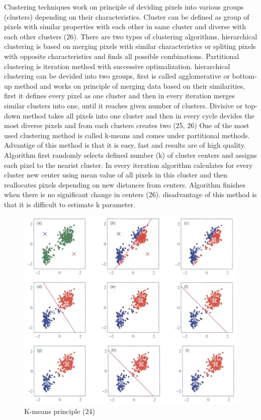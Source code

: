 \documentclass[a4paper,12pt]{article}   %
\numberwithin{equation}{section}        %
\begin{document}
        Clustering techniques work on principle of deviding pixels into various groups (clusters) depending on their characteristics. Cluster can be defined as group of pixels
        with similar properties with each other in same cluster and diverse with each other clusters (26). There are two types of clustering algorithms, hierarchical clustering
        is based on merging pixels with similar characteristics or spliting pixels with opposite characteristics and finds all possible combinations. Partitional clustering
        is iteration method with successive optimalization. hierarchical clustering can be devided into two groups, first is called agglomerative or bottom-up method and
        works on principle of merging data based on their similarities, first it defines every pixel as one cluster and then in every iteration merges similar clusters into one, until
        it reaches given number of clusters. Divisive or top-down method takes all pixels into one cluster and then in every cycle devides the most diverse pixels and from each clusters
        creates two (25, 26) One of the most used clustering method is called k-means and comes under partitional methods. Advantige of this method is that it is easy, fast and results are
        of high quality. Algorithm first randomly selects defined number (k) of cluster centers and assigns each pixel to the nearist cluster. In every iteration algorithm
        calculates for every cluster new center using mean value of all pixels in this cluster and then reallocates pixels depending on new distances from centers.
        Algorithm finishes when there is no significant change in centers (26). disadvantage of this method is that it is difficult to estimate k parameter.

        \begin{figure}[h]
            \includegraphics[width=\linewidth]{k-means.jpg}
            \caption{K-means principle (24)}
            \label{fig:k-means}
        \end{figure}
\end{document}
